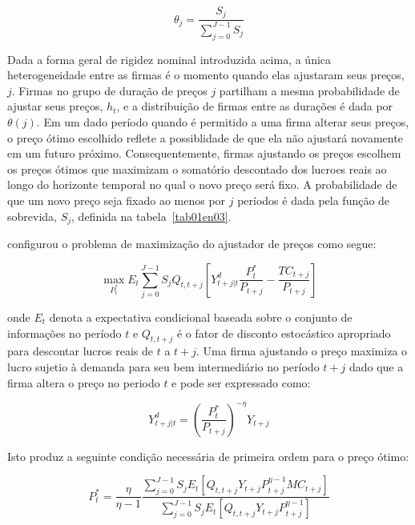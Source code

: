 \documentclass[twoside,a4paper,11pt]{report}
\begin{document}
\begin{equation}\label{eq15en03}
{\theta}_{j}=\frac{{S}_{j}}{\sum _{j=0}^{J-1}{{S}_{j}}} 
\end{equation}

Dada a forma geral de rigidez nominal introduzida acima, a única heterogeneidade entre as firmas é o momento quando elas ajustaram seus preços, $j$. Firmas no grupo de duração de preços $j$ partilham a mesma probabilidade de ajustar seus preços, $h_{t}$, e a distribuição de firmas entre as durações é dada por ${\theta}(j)$. Em um dado período quando é permitido a uma firma alterar seus preços, o preço ótimo escolhido reflete a possiblidade de que ela não ajustará novamente em um futuro próximo. Consequentemente, firmas ajustando os preços escolhem os preços ótimos que maximizam o somatório descontado dos lucroes reais ao longo do horizonte temporal no qual o novo preço será fixo. A probabilidade de que um novo preço seja fixado ao menos por $j$ períodos é dada pela função de sobrevida, $S_{j}$, definida na tabela~\ref{tab01en03}.

\citet{yao2010aggregate} configurou o problema de maximização do ajustador de preços como segue:

\begin{equation}\label{eq16en03}
\max _{{P}_{t}^{*}}{{E}_{t}\sum _{j=0}^{J-1}{{S}_{j}{Q}_{t,t+j}[{Y}_{t+j|t}^{d}\frac{{P}_{t}^{*}}{{P}_{t+j}}-\frac{{TC}_{t+j }}{{P}_{t+j}}]}} 
\end{equation}

\noindent onde ${ E }_{ t }$ denota a expectativa condicional baseada sobre o conjunto de informações no período $t$ e ${ Q }_{ t,t+j }$ é o fator de disconto estocástico apropriado para descontar lucros reais de $t$ a $t+j$. Uma firma ajustando o preço maximiza o lucro sujetio à demanda para seu bem intermediário no período $t+j$ dado que a firma altera o preço no periodo $t$ e pode ser expressado como: 

\begin{equation}\label{eq17en03}
{ Y }_{ t+j|t }^{ d }={ \left( \frac { { P }_{ t }^{ * } }{ { P }_{ t+j } }  \right)  }^{ -\eta  }{ Y }_{ t+j }
\end{equation}

Isto produz a seguinte condição necessária de primeira ordem para o preço ótimo:

\begin{equation}\label{eq18en03}
{P}_{t}^{*}=\frac{\eta}{\eta -1}\frac{\sum_{j=0}^{J-1}{{S}_{j}{E}_{t}[{Q}_{t,t+j}{Y}_{t+j}{P}_{t+j}^{\eta -1}{MC}_{t+j}]}}{\sum_{j=0}^{J-1}{{S}_{j}{E}_{t}[{Q}_{t,t+j}{Y}_{t+j}{P}_{t+j}^{\eta -1}]}} 
\end{equation}
\end{document}
